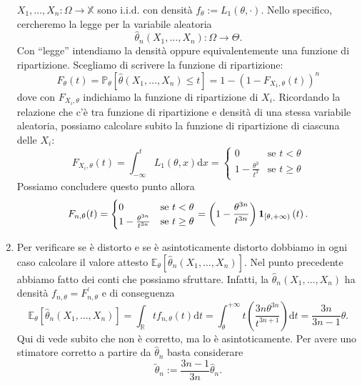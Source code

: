 \begin{soluzione}
\begin{enumerate}
    \(X_1, \dots{}, X_n : \Omega \to \mathbb{X}\) sono i.i.d. con
    densità \(f_\theta := L_1(\theta, \cdot)\). Nello specifico,
    cercheremo la legge per la variabile aleatoria
    \[
      \hat \theta_n(X_1, \dots{}, X_n) : \Omega \to \Theta .
    \]
    Con ``legge'' intendiamo la densità oppure equivalentemente una
    funzione di ripartizione. Scegliamo di scrivere la funzione di
    ripartizione:
    \[
      F_\theta (t) = \mathbb{P}_\theta \left[\hat\theta(X_1, \dots{},
        X_n) \le t\right] = 1 - \left(1-F_{X_1, \theta}(t)\right)^n
    \]
    dove con \(F_{X_i, \theta}\) indichiamo la funzione di
    ripartizione di \(X_i\). Ricordando la relazione che c'è tra
    funzione di ripartizione e densità di una stessa variabile
    aleatoria, possiamo calcolare subito la funzione di ripartizione
    di ciascuna delle \(X_i\):
    \[
      F_{X_i, \theta}(t) = \int_{-\infty}^t L_1(\theta, x) \mathrm d x
      = \begin{cases} 0 & \text{se } t < \theta \\ 1 -
        \frac{\theta^3}{t^3} & \text{se } t \ge \theta \end{cases}
    \]
    Possiamo concludere questo punto allora
    \[
      F_{n, \theta}(t) =
      \begin{cases}
        0 & \text{se } t < \theta \\
        1 - \frac{\theta^{3n}}{t^{3n}} & \text{se } t \ge \theta
      \end{cases} =
      \left( 1 - \frac{\theta^{3n}}{t^{3n}} \right) \mathbf 1_{[\theta, +\infty)}\left(t\right).
    \]
    
  \item Per verificare se è distorto e se è asintoticamente distorto
    dobbiamo in ogni caso calcolare il valore attesto
    \(\mathbb{E}_{\theta}\left[\hat\theta_n\left( X_1, \dots{}, X_n
      \right)\right]\). Nel punto precedente abbiamo fatto dei conti
    che possiamo sfruttare. Infatti, la
    \(\hat\theta_n(X_1, \dots{}, X_n)\) ha densità
    \(f_{n, \theta} = F_{n, \theta}^\prime\) e di conseguenza
    \[
      \mathbb{E}_{\theta}\left[\hat\theta_n(X_1, \dots{}, X_n)\right]
      = \int_{\mathbb{R}}t f_{n, \theta}(t) \mathrm d t =
      \int_{\theta}^{+\infty} t \left(\frac{3n \theta^{3n}}{t^{3n+1}}
      \right) \mathrm d t = \frac{3n}{3n - 1} \theta.
    \]
    Qui di vede subito che non è corretto, ma lo è
    asintoticamente. Per avere uno stimatore corretto a partire da
    \(\hat\theta_n\) basta considerare
    \[
      \tilde \theta_n := \frac{3n-1}{3n} \hat\theta_n .
    \]
    

\end{enumerate}
\end{soluzione}
